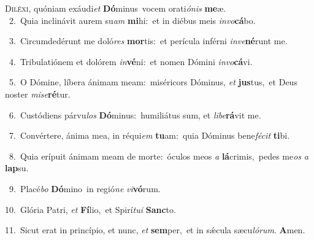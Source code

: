\lettrine{\initial\textcolor{\initialcolor}{D}}{iléxi,} quóniam exáudi\textit{et} \textbf{Dó}\-minus~\star vocem orati\-\textit{ó}\-\textit{nis} \textbf{me}\-æ.\\
{\numbfont\textcolor{\numbcolor}{~2.}}~Quia inclinávit aurem su\textit{am} \textbf{mi}\-hi:~\star et in diébus meis \textit{in}\-\textit{vo}\textbf{cá}bo.\par
{\numbfont\textcolor{\numbcolor}{~3.}}~Circumdedérunt me doló\textit{res} \textbf{mor}\-tis:~\star et perícula inférni \textit{in}\-\textit{ve}\textbf{né}runt me.\par
{\numbfont\textcolor{\numbcolor}{~4.}}~Tribulatiónem et dolórem \textit{in}\-\textbf{vé}ni:~\star et nomen Dómini \textit{in}\-\textit{vo}\textbf{cá}vi.\par
{\numbfont\textcolor{\numbcolor}{~5.}}~O Dómine, líbera ánimam meam:~\dagger miséricors Dóminus, \textit{et} \textbf{jus}\-tus,~\star et Deus noster \textit{mi}\-\textit{se}\textbf{ré}tur.\par
{\numbfont\textcolor{\numbcolor}{~6.}}~Custódiens párvu\textit{los} \textbf{Dó}\-minus:~\star humiliátus sum, et \textit{li}\-\textit{be}\textbf{rá}vit me.\par
{\numbfont\textcolor{\numbcolor}{~7.}}~Convértere, ánima mea, in réqui\textit{em} \textbf{tu}\-am:~\star quia Dóminus bene\-\textit{fé}\-\textit{cit} \textbf{ti}\-bi.\par
{\numbfont\textcolor{\numbcolor}{~8.}}~Quia erípuit ánimam meam de morte:~\dagger óculos meos \textit{a} \textbf{lá}\-crimis,~\star pedes me\textit{os} \textit{a} \textbf{lap}\-su.\par
{\numbfont\textcolor{\numbcolor}{~9.}}~Placé\textit{bo} \textbf{Dó}\-mino~\star in regió\textit{ne} \textit{vi}\-\textbf{vó}rum.\par
{\numbfont\textcolor{\numbcolor}{10.}}~Glória Patri, \textit{et} \textbf{Fí}\-lio,~\star et Spirí\-\textit{tu}\-\textit{i} \textbf{Sanc}\-to.\par
{\numbfont\textcolor{\numbcolor}{11.}}~Sicut erat in princípio, et nunc, \textit{et} \textbf{sem}\-per,~\star et in sǽcula sæcu\-\textit{ló}\-\textit{rum}. \textbf{A}\-men.\par
